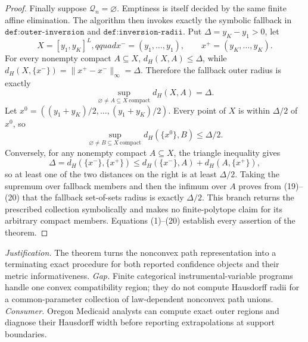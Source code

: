 \documentclass{article}
\begin{document}
\begin{proof}
Finally suppose \(\mathcal Q_n=\varnothing\).  Emptiness is itself decided by the same finite affine elimination.  The algorithm then invokes exactly the symbolic fallback in \(\texttt{def:outer-inversion}\) and \(\texttt{def:inversion-radii}\).  Put \(\Delta=y_K-y_1>0\), let
\[
 X=[y_1,y_K]^L,qquad
 x^-=(y_1,\ldots,y_1),\qquad x^+=(y_K,\ldots,y_K).
\]
For every nonempty compact \(A\subseteq X\), \(d_H(X,A)\leq\Delta\), while
\(d_H(X,\{x^-\})=\|x^+-x^-\|_\infty=\Delta\).  Therefore the fallback outer radius is exactly
\[
 \sup_{\varnothing\neq A\subseteq X\ \mathrm{compact}}d_H(X,A)=\Delta.
 \tag{18}
\]
Let \(x^0=((y_1+y_K)/2,\ldots,(y_1+y_K)/2)\).  Every point of \(X\) is within \(\Delta/2\) of \(x^0\), so
\[
 \sup_{\varnothing\neq B\subseteq X\ \mathrm{compact}}d_H(\{x^0\},B)\leq\Delta/2.
 \tag{19}
\]
Conversely, for any nonempty compact \(A\subseteq X\), the triangle inequality gives
\[
 \Delta=d_H(\{x^-\},\{x^+\})
 \leq d_H(\{x^-\},A)+d_H(A,\{x^+\}),
 \tag{20}
\]
so at least one of the two distances on the right is at least \(\Delta/2\).  Taking the supremum over fallback members and then the infimum over \(A\) proves from (19)--(20) that the fallback set-of-sets radius is exactly \(\Delta/2\).  This branch returns the prescribed collection symbolically and makes no finite-polytope claim for its arbitrary compact members.  Equations (1)--(20) establish every assertion of the theorem.
\end{proof}
\par\smallskip\noindent \textit{Justification.} The theorem turns the nonconvex path representation into a terminating exact procedure for both reported confidence objects and their metric informativeness. \textit{Gap.} Finite categorical instrumental-variable programs handle one convex compatibility region; they do not compute Hausdorff radii for a common-parameter collection of law-dependent nonconvex path unions. \textit{Consumer.} Oregon Medicaid analysts can compute exact outer regions and diagnose their Hausdorff width before reporting extrapolations at support boundaries.
\end{document}
